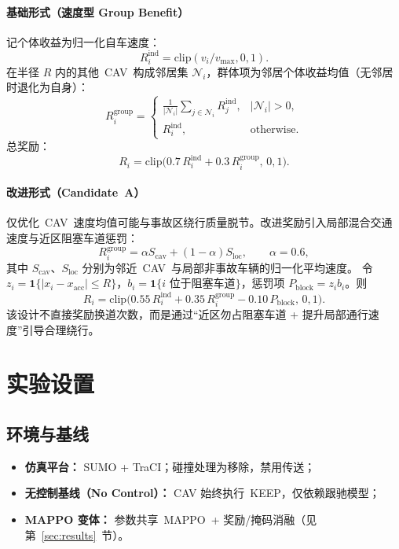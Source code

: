 \documentclass[UTF8,a4paper,11pt]{ctexart}
\begin{document}
\paragraph{基础形式（速度型 Group Benefit）}
记个体收益为归一化自车速度：
\begin{equation}
  R_i^{\mathrm{ind}} = \mathrm{clip}(v_i/v_{\max},0,1).
\end{equation}
在半径 $R$ 内的其他~CAV~构成邻居集 $\mathcal{N}_i$，群体项为邻居个体收益均值（无邻居时退化为自身）：
\begin{equation}
  R_i^{\mathrm{group}} =
  \begin{cases}
    \displaystyle\frac{1}{|\mathcal{N}_i|}\sum_{j\in\mathcal{N}_i} R_j^{\mathrm{ind}}, & |\mathcal{N}_i|>0,\\[0.6em]
    R_i^{\mathrm{ind}}, & \text{otherwise}.
  \end{cases}
\end{equation}
总奖励：
\begin{equation}
  R_i = \mathrm{clip}\big(0.7\,R_i^{\mathrm{ind}} + 0.3\,R_i^{\mathrm{group}},\,0,1\big).
\end{equation}

\paragraph{改进形式（Candidate~A）}
仅优化~CAV~速度均值可能与事故区绕行质量脱节。改进奖励引入局部混合交通速度与近区阻塞车道惩罚：
\begin{equation}
  R_i^{\mathrm{group}} = \alpha S_{\mathrm{cav}} + (1-\alpha) S_{\mathrm{loc}},
  \qquad \alpha=0.6,
\end{equation}
其中 $S_{\mathrm{cav}}$、$S_{\mathrm{loc}}$ 分别为邻近~CAV~与局部非事故车辆的归一化平均速度。
令 $z_i=\mathbf{1}\{|x_i-x_{\mathrm{acc}}|\le R\}$，$b_i=\mathbf{1}\{i\text{ 位于阻塞车道}\}$，惩罚项 $P_{\mathrm{block}}=z_i b_i$。则
\begin{equation}
  R_i = \mathrm{clip}\big(
    0.55\,R_i^{\mathrm{ind}} + 0.35\,R_i^{\mathrm{group}} - 0.10\,P_{\mathrm{block}},\,0,1
  \big).
\end{equation}
该设计不直接奖励换道次数，而是通过“近区勿占阻塞车道 + 提升局部通行速度”引导合理绕行。

\section{实验设置}

\subsection{环境与基线}
\begin{itemize}[leftmargin=2em]
  \item \textbf{仿真平台：} SUMO + TraCI；碰撞处理为移除，禁用传送；
  \item \textbf{无控制基线（No Control）：} CAV 始终执行~KEEP，仅依赖跟驰模型；
  \item \textbf{MAPPO 变体：} 参数共享~MAPPO~+ 奖励/掩码消融（见第~\ref{sec:results}~节）。
\end{itemize}
\end{document}
